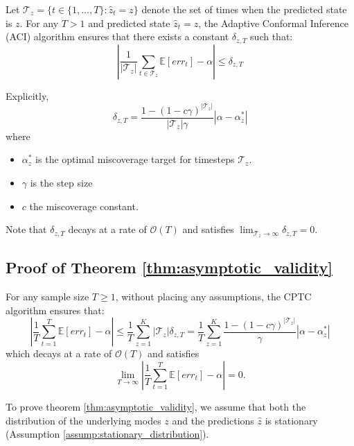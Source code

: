 \begin{lemma}\label{lemma:aci_within_states} Let \( \mathcal{T}_z = \{ t \in \{1, \dots, T\} : \hat{z}_t = z \} \) denote the set of times when the predicted state is \( z \). For any \( T > 1 \) and predicted state \( \hat{z}_t = z \), the Adaptive Conformal Inference (ACI) algorithm ensures that there exists a constant \( \delta_{z, T} \) such that:
 \[ 
\left| \frac{1}{|\mathcal{T}_z|} \sum_{t \in \mathcal{T}_z} \mathbb{E}[err_t] - \alpha \right| \leq \delta_{z, T}
\]

Explicitly, 
\[
\delta_{z,T} =  \frac{1 - (1-c\gamma)^{|\mathcal{T}_z|}}{|\mathcal{T}_z| \gamma} |\alpha - \alpha^{*}_z|
\]
where 
\begin{itemize}
    \item  $\alpha^*_z$ is the optimal miscoverage target for timesteps $\mathcal{T}_z$.
    \item $\gamma$ is the step size
    \item $c$ the miscoverage constant.
\end{itemize}  Note that $\delta_{z,T}$ decays at a rate of $\mathcal{O}(T)$ and satisfies
$ \lim_{\mathcal{T}_z \to \infty} \delta_{z,T} = 0$.

\end{lemma}

\subsection{Proof of Theorem \ref{thm:asymptotic_validity}}

\begin{theorem*}
For any sample size \( T \geq 1 \), without placing any assumptions, the CPTC algorithm ensures that:
\[  
\left| \frac{1}{T} \sum_{t=1}^T \mathbb{E}[err_t] - \alpha \right| \leq \frac{1}{T} \sum_{z=1}^K    |\mathcal{T}_z | \delta_{z,T}  = \frac{1}{T} \sum_{z=1}^K  \frac{ 1 - (1-c\gamma)^{|\mathcal{T}_z|}  }{\gamma} |\alpha - \alpha^{*}_z|
\]
which decays at a rate of $\mathcal{O}(T)$ and satisfies
 \[
 \lim_{T \to \infty} \left| \frac{1}{T} \sum_{t=1}^T \mathbb{E}[err_t] - \alpha \right|= 0.
 \]
\end{theorem*}

To prove theorem \ref{thm:asymptotic_validity}, we assume that both the distribution of the underlying modes $z$ and the predictions $\hat{z}$ is stationary (Assumption \ref{assump:stationary_distribution}). 

